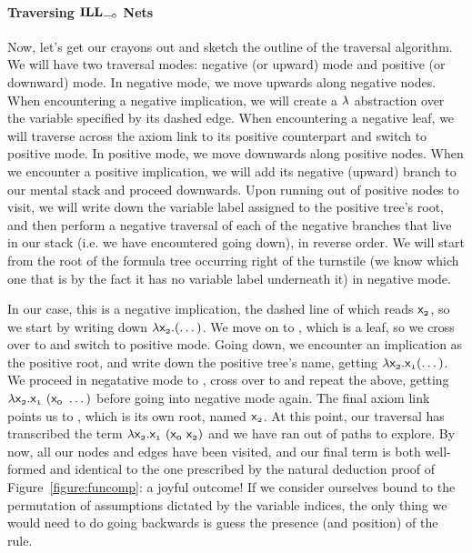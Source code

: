 \paragraph{Traversing $\ILL_{\li}$ Nets}
Now, let's get our crayons out and sketch the outline of the traversal algorithm.
We will have two traversal modes: negative (or upward) mode and positive (or downward) mode.
In negative mode, we move upwards along negative nodes.
When encountering a negative implication, we will create a $\mathnormal{\lambda}$ abstraction over the variable specified by its dashed edge.
When encountering a negative leaf, we will traverse across the axiom link to its positive counterpart and switch to positive mode.
In positive mode, we move downwards along positive nodes.
When we encounter a positive implication, we will add  its negative (upward) branch to our mental stack and proceed downwards.
Upon running out of positive nodes to visit, we will write down the variable label assigned to the positive tree's root, and then perform a negative traversal of each of the negative branches that live in our stack (i.e. we have encountered going down), in reverse order.
We will start from the root of the formula tree occurring right of the turnstile (we know which one that is by the fact it has no variable label underneath it) in negative mode.

In our case, this is a negative implication, the dashed line of which reads $\mathsf{\mathsf{x}_{\mathnormal{2}}}$, so we start by writing down $\mathsf{\mathnormal{\lambda} \mathsf{x}_{\mathnormal{2}}. (\dots)}$. 
We move on to , which is a leaf, so we cross over to  and switch to positive mode. Going down, we encounter an implication as the positive root, and write down the positive tree's name, getting $\mathsf{\mathnormal{\lambda} \mathsf{x}_{\mathnormal{2}}.\mathsf{x}_{\mathnormal{1}} (\dots)}$.
We proceed in negatative mode to , cross over to  and repeat the above, getting $\mathsf{\mathnormal{\lambda} \mathsf{x}_{\mathnormal{2}}.\mathsf{x}_{\mathnormal{1}}~(\mathsf{x}_{\mathnormal{0}}~\dots)}$ before going into negative mode again.
The final axiom link points us to , which is its own root, named $\mathsf{\mathsf{x}_{\mathnormal{2}}}$.
At this point, our traversal has transcribed the term $\mathsf{\mathnormal{\lambda} \mathsf{x}_{\mathnormal{2}}.\mathsf{x}_{\mathnormal{1}}~(\mathsf{x}_{\mathnormal{0}}~\mathsf{x}_{\mathnormal{2}})}$ and we have ran out of paths to explore.
By now, all our nodes and edges have been visited, and our final term is both well-formed and identical to the one prescribed by the natural deduction proof of Figure~\ref{figure:funcomp}: a joyful outcome!
If we consider ourselves bound to the permutation of assumptions dictated by the variable indices, the only thing we would need to do going backwards is guess the presence (and position) of the \Exchange{} rule.


